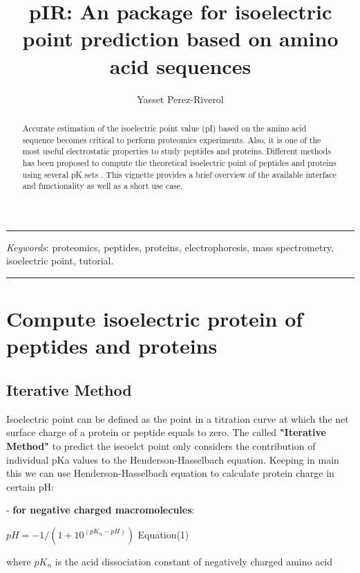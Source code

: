\documentclass{article}
\title{pIR: An \R{} package for isoelectric point prediction based on amino acid sequences}
\author{Yasset Perez-Riverol}
\begin{document}


\maketitle


\hrule
\begin{abstract}
   Accurate estimation of the isoelectric point value (pI) based on the amino acid sequence becomes critical to perform proteomics experiments. Also, it is one of the most useful electrostatic properties to study peptides and proteins. Different methods has been proposed to compute the theoretical isoelectric point of peptides and proteins using several pK sets \cite{perez2012, cargile2008, bjellqvist1993}. This vignette provides a brief overview of the available interface and functionality as well as a short use case.
\end{abstract}

\textit{Keywords}: proteomics, peptides, proteins, electrophoresis, mass spectrometry, isoelectric point, tutorial.
\hrule
{}
\vspace{10mm}


\tableofcontents

\section{Compute isoelectric protein of peptides and proteins}
\subsection{Iterative Method}
 Isoelectric point can be defined as the point in a titration curve at which the net surface charge of a protein or peptide equals to zero. The called \textbf{"Iterative Method"} to predict the iseoelct point only considers the contribution of individual pKa values to the Henderson-Hasselbach equation. Keeping in main this we can use Henderson-Hasselbach equation to calculate protein charge in certain pH:

- \textbf{for negative charged macromolecules}:

\begin{center}
        \( pH = -1/(1+10^{(pK_n - pH)}) \)   Equation(1)
\end{center}

where \(pK_n\) is the acid dissociation constant of negatively charged amino acid
\end{document}
